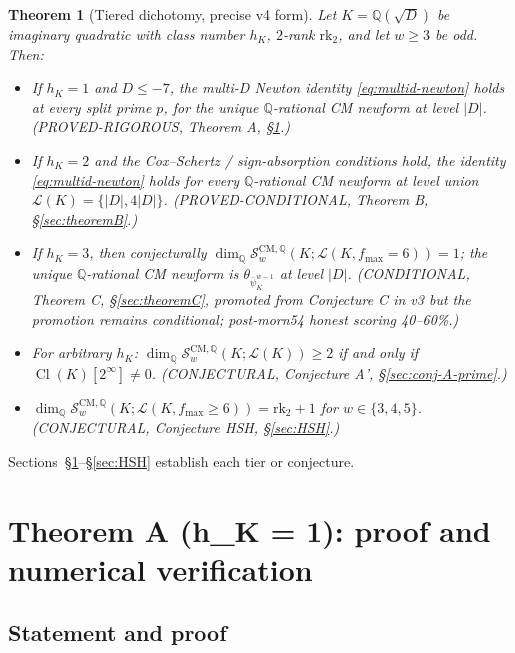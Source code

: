 \documentclass[11pt,a4paper]{amsart}
\newtheorem{theorem}{Theorem}[section]
\theoremstyle{definition}
\DeclareMathOperator{\Cl}{Cl}
\newcommand{\Q}{\mathbb{Q}}
\newcommand{\Lcal}{\mathcal{L}}
\newcommand{\Scal}{\mathcal{S}}
\newcommand{\hK}{h_{K}}
\newcommand{\rktwo}{\mathrm{rk}_2}
\begin{document}
\begin{theorem}[Tiered dichotomy, precise v4 form]\label{thm:dichotomy-v4-precise}
Let $K = \Q(\sqrt{D})$ be imaginary quadratic with class number $\hK$, $2$-rank $\rktwo$, and let $w \ge 3$ be odd. Then:
\begin{itemize}[leftmargin=2em]
  \item[\textbf{(A)}] If $\hK = 1$ and $D \le -7$, the multi-D Newton identity \eqref{eq:multid-newton} holds at every split prime $p$, for the unique $\Q$-rational CM newform at level $|D|$. \emph{(PROVED-RIGOROUS, Theorem A, \S\ref{sec:theoremA}.)}
  \item[\textbf{(B)}] If $\hK = 2$ and the Cox--Schertz / sign-absorption conditions hold, the identity \eqref{eq:multid-newton} holds for every $\Q$-rational CM newform at level union $\Lcal(K) = \{|D|, 4|D|\}$. \emph{(PROVED-CONDITIONAL, Theorem B, \S\ref{sec:theoremB}.)}
  \item[\textbf{(C)}] If $\hK = 3$, then conjecturally $\dim_\Q \Scal_w^{\mathrm{CM}, \Q}(K; \Lcal(K, f_{\max} = 6)) = 1$; the unique $\Q$-rational CM newform is $\theta_{\bar\psi_K^{w-1}}$ at level $|D|$. \emph{(CONDITIONAL, Theorem C, \S\ref{sec:theoremC}, promoted from Conjecture C in v3 but the promotion remains conditional; post-morn54 honest scoring 40--60\%.)}
  \item[\textbf{(A')}] For arbitrary $\hK$: $\dim_\Q \Scal_w^{\mathrm{CM},\Q}(K; \Lcal(K)) \ge 2$ if and only if $\Cl(K)[2^\infty] \ne 0$. \emph{(CONJECTURAL, Conjecture A', \S\ref{sec:conj-A-prime}.)}
  \item[\textbf{(HSH)}] $\dim_\Q \Scal_w^{\mathrm{CM},\Q}(K; \Lcal(K, f_{\max} \ge 6)) = \rktwo + 1$ for $w \in \{3, 4, 5\}$. \emph{(CONJECTURAL, Conjecture HSH, \S\ref{sec:HSH}.)}
\end{itemize}
\end{theorem}

Sections~\S\ref{sec:theoremA}--\S\ref{sec:HSH} establish each tier or conjecture.


\section{Theorem A (h\_K = 1): proof and numerical verification}\label{sec:theoremA}

\subsection{Statement and proof}\label{sec:thmA-proof}
\end{document}
